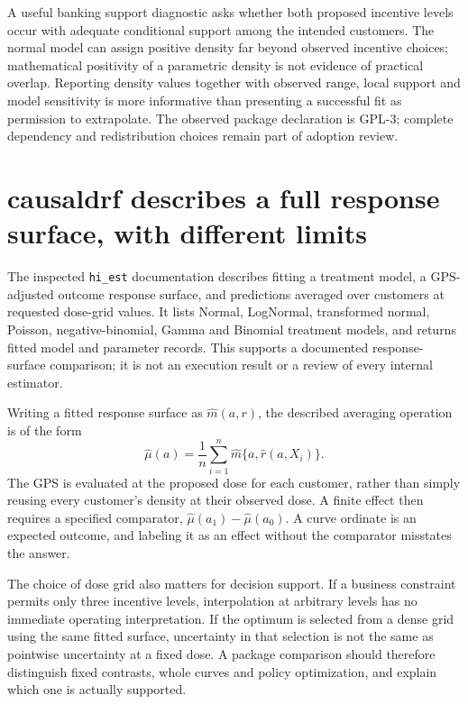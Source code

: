 A useful banking support diagnostic asks whether both proposed incentive levels
occur with adequate conditional support among the intended customers. The
normal model can assign positive density far beyond observed incentive choices;
mathematical positivity of a parametric density is not evidence of practical
overlap. Reporting density values together with observed range, local support
and model sensitivity is more informative than presenting a successful fit as
permission to extrapolate. The observed package declaration is GPL-3; complete
dependency and redistribution choices remain part of adoption review.

\section{causaldrf describes a full response surface, with different limits}

The inspected \texttt{hi\_est} documentation describes fitting a treatment
model, a GPS-adjusted outcome response surface, and predictions averaged over
customers at requested dose-grid values. It lists Normal, LogNormal, transformed
normal, Poisson, negative-binomial, Gamma and Binomial treatment models, and
returns fitted model and parameter records. This supports a documented
response-surface comparison; it is not an execution result or a review of every
internal estimator.\cite{v13_sw_causaldrf}

Writing a fitted response surface as $\widehat m(a,r)$, the described averaging
operation is of the form
\[
 \widehat\mu(a)=\frac1n\sum_{i=1}^n
                      \widehat m\{a,\widehat r(a,X_i)\}.
\]
The GPS is evaluated at the proposed dose for each customer, rather than simply
reusing every customer's density at their observed dose. A finite effect then
requires a specified comparator, $\widehat\mu(a_1)-\widehat\mu(a_0)$.
A curve ordinate is an expected outcome, and labeling it as an effect without
the comparator misstates the answer.

The choice of dose grid also matters for decision support. If a business
constraint permits only three incentive levels, interpolation at arbitrary
levels has no immediate operating interpretation. If the optimum is selected
from a dense grid using the same fitted surface, uncertainty in that selection
is not the same as pointwise uncertainty at a fixed dose. A package comparison
should therefore distinguish fixed contrasts, whole curves and policy
optimization, and explain which one is actually supported.


